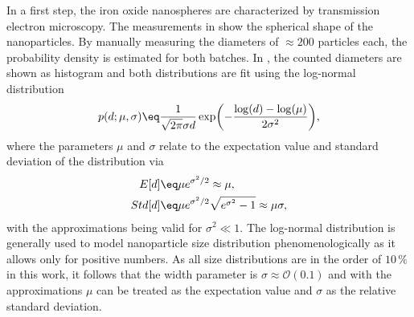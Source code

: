 \documentclass[\main/dresen_thesis.tex]{subfiles}
\begin{document}
In a first step, the iron oxide nanospheres are characterized by transmission electron microscopy.
The measurements in  show the spherical shape of the nanoparticles.
By manually measuring the diameters of $\approx 200$ particles each, the probability density is estimated for both batches.
In , the counted diameters are shown as histogram and both distributions are fit using the log-normal distribution
\begin{align}
  p(d; \mu, \sigma) \eq \frac{1}{\sqrt{2\pi} \sigma d} \exp \biggl( - \frac{\log(d) - \log(\mu)}{2 \sigma^2} \biggr),
\end{align}
where the parameters $\mu$ and $\sigma$ relate to the expectation value and standard deviation of the distribution via
\begin{align}
  E[d] \eq& \mu e^{\sigma^2/2} \approx \mu,\\
  Std[d] \eq& \mu e^{\sigma^2/2} \sqrt{e^{\sigma^2} - 1} \approx \mu \sigma,\\
\end{align}
with the approximations being valid for $\sigma^2 \ll 1$.
The log-normal distribution is generally used to model nanoparticle size distribution phenomenologically as it allows only for positive numbers.
As all size distributions are in the order of $10 \, \%$ in this work, it follows that the width parameter is $\sigma \approx \mathcal{O}(0.1)$ and with the approximations $\mu$ can be treated as the expectation value and $\sigma$ as the relative standard deviation.
\end{document}
